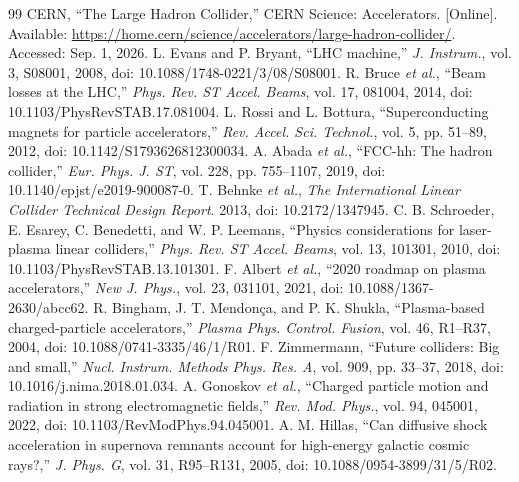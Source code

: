 \documentclass[conference]{../../../../Conference-LaTeX-template_10-17-19/IEEEtran}
\begin{document}
\begin{thebibliography}{99}
 CERN, ``The Large Hadron Collider,'' CERN Science: Accelerators. [Online]. Available: \url{https://home.cern/science/accelerators/large-hadron-collider/}. Accessed: Sep. 1, 2026.
 L. Evans and P. Bryant, ``LHC machine,'' \emph{J. Instrum.}, vol. 3, S08001, 2008, doi: 10.1088/1748-0221/3/08/S08001.
 R. Bruce \emph{et al.}, ``Beam losses at the LHC,'' \emph{Phys. Rev. ST Accel. Beams}, vol. 17, 081004, 2014, doi: 10.1103/PhysRevSTAB.17.081004.
 L. Rossi and L. Bottura, ``Superconducting magnets for particle accelerators,'' \emph{Rev. Accel. Sci. Technol.}, vol. 5, pp. 51--89, 2012, doi: 10.1142/S1793626812300034.
 A. Abada \emph{et al.}, ``FCC-hh: The hadron collider,'' \emph{Eur. Phys. J. ST}, vol. 228, pp. 755--1107, 2019, doi: 10.1140/epjst/e2019-900087-0.
 T. Behnke \emph{et al.}, \emph{The International Linear Collider Technical Design Report}. 2013, doi: 10.2172/1347945.
 C. B. Schroeder, E. Esarey, C. Benedetti, and W. P. Leemans, ``Physics considerations for laser-plasma linear colliders,'' \emph{Phys. Rev. ST Accel. Beams}, vol. 13, 101301, 2010, doi: 10.1103/PhysRevSTAB.13.101301.
 F. Albert \emph{et al.}, ``2020 roadmap on plasma accelerators,'' \emph{New J. Phys.}, vol. 23, 031101, 2021, doi: 10.1088/1367-2630/abcc62.
 R. Bingham, J. T. Mendon\c{c}a, and P. K. Shukla, ``Plasma-based charged-particle accelerators,'' \emph{Plasma Phys. Control. Fusion}, vol. 46, R1--R37, 2004, doi: 10.1088/0741-3335/46/1/R01.
 F. Zimmermann, ``Future colliders: Big and small,'' \emph{Nucl. Instrum. Methods Phys. Res. A}, vol. 909, pp. 33--37, 2018, doi: 10.1016/j.nima.2018.01.034.
 A. Gonoskov \emph{et al.}, ``Charged particle motion and radiation in strong electromagnetic fields,'' \emph{Rev. Mod. Phys.}, vol. 94, 045001, 2022, doi: 10.1103/RevModPhys.94.045001.
 A. M. Hillas, ``Can diffusive shock acceleration in supernova remnants account for high-energy galactic cosmic rays?,'' \emph{J. Phys. G}, vol. 31, R95--R131, 2005, doi: 10.1088/0954-3899/31/5/R02.
\end{thebibliography}
\end{document}
